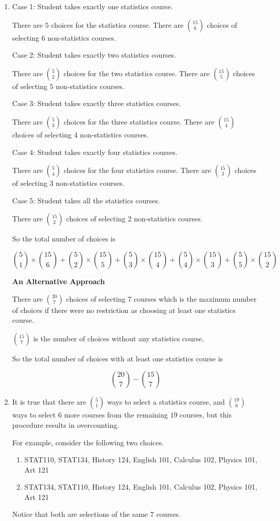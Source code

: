 \begin{enumerate}[label=(\alph*)]
\item Case 1: Student takes exactly one statistics course.
  
  There are $5$ choices for the statistics course. There are ${15 \choose 6}$ 
  choices of selecting $6$ non-statistics courses.
  
  Case 2: Student takes exactly two statistics courses.
  
  There are ${5 \choose 2}$ choices for the two statistics course. 
  There are ${15 \choose 5}$ choices of selecting $5$ non-statistics courses.
  
  Case 3: Student takes exactly three statistics courses.
  
  There are ${5 \choose 3}$ choices for the three statistics course. 
  There are ${15 \choose 4}$ choices of selecting $4$ non-statistics courses.
  
  Case 4: Student takes exactly four statistics courses.
  
  There are ${5 \choose 4}$ choices for the four statistics course. 
  There are ${15 \choose 3}$ choices of selecting $3$ non-statistics courses.
  
  Case 5: Student takes all the statistics courses.
  
  There are ${15 \choose 2}$ choices of selecting $2$ non-statistics courses.
  
  So the total number of choices is
  
  $${5 \choose 1} \times {15 \choose 6} + {5 \choose 2} \times {15 \choose 5} + 
  {5 \choose 3} \times {15 \choose 4} + {5 \choose 4} \times {15 \choose 3} + 
  {5 \choose 5} \times {15 \choose 2}$$
  
  \textbf{An Alternative Approach}

  There are  ${20 \choose 7}$  choices of selecting 7 courses which is the maximum number of choices if there were no restriction as choosing at least one statistics course.

  ${15 \choose 7}$ is the number of choices without any statistics course.

  So the total number of choices with at least one statistics course is

  $${20 \choose 7} - {15 \choose 7}$$

\item It is true that there are ${5 \choose 1}$ ways to select a statistics 
course, and ${19 \choose 6}$ ways to select $6$ more courses from the remaining 
$19$ courses, but this procedure results in overcounting.
  
  For example, consider the following two choices.
  
  \begin{enumerate}[label=(\alph*)]
  \item STAT110, STAT134, History 124, English 101, Calculus 102, Physics 101, Art 121
  \item STAT134, STAT110, History 124, English 101, Calculus 102, Physics 101, Art 121
  \end{enumerate}
  
  Notice that both are selections of the same $7$ courses.
\end{enumerate}